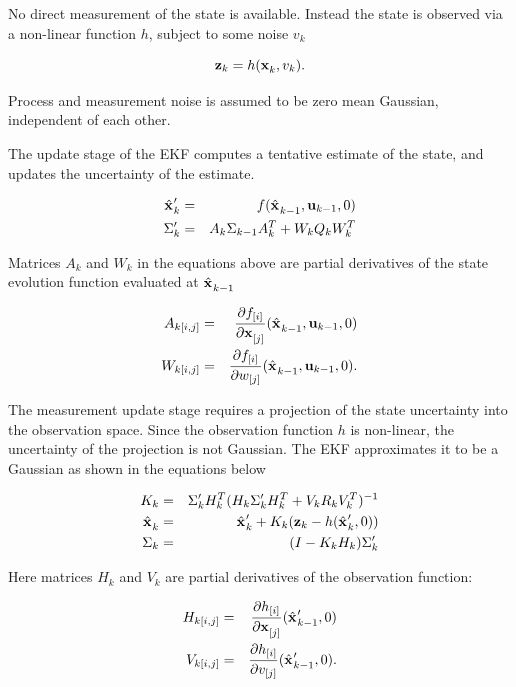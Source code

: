 No direct measurement of the state is available. Instead the state is
observed via a non-linear function $h$, subject to some noise $v_k$

\begin{equation}
   \z{k} = h (\x{k}{}{}, v_k).
\end{equation}

Process and measurement noise is assumed to be zero mean Gaussian,
independent of each other.

The update stage of the EKF computes a tentative estimate of the state,
and updates the uncertainty of the estimate.

\begin{eqnarray}
\label{eqn:ekf_x_u}
\hat{\x{}{}{}}_k^\prime &=& f(\hat{\x{}{}{}}_{k-1},\U{k-1},0)\\
\label{eqn:ekf_sigma_u}
\Sigma_k^\prime &=& A_k \Sigma_{k-1} A_k^T + W_k Q_{k} W_k^T
\end{eqnarray}

Matrices $A_k$ and $W_k$ in the equations above are partial
derivatives of the state evolution function evaluated at
$\hat{\x{}{}{}}_{k-1}$

\begin{eqnarray}
A_{k[i,j]} &=& \frac{\partial f_{[i]}}{\partial \x{[j]}{}{}}
              (\hat{\x{}{}{}}_{k-1}, \U{k-1}, 0) \\
W_{k[i,j]} &=& \frac{\partial f_{[i]}}{\partial w_{[j]}}
              (\hat{\x{}{}{}}_{k-1}, \U{k-1}, 0).
\end{eqnarray}


The measurement update stage requires a projection of the state
uncertainty into the observation space. Since the observation function $h$
is non-linear, the uncertainty of the projection is not Gaussian. The
EKF approximates it to be a Gaussian as shown in the equations below

\begin{eqnarray}
\label{eqn:ekf_gain}
K_k &=& \Sigma_k^\prime H_k^T(H_k\Sigma_k^\prime H_k^T + V_k R_k
V_k^T)^{-1}\\
\label{eqn:ekf_x_obs}
\hat{\x{}{}{}}_k &=& \hat{\x{}{}{}}_k^\prime + 
                      K_k (\z{k} - h(\hat{\x{}{}{}}_k^\prime,0))\\
\label{eqn:ekf_sigma_obs}
\Sigma_k &=& (I - K_k H_k) \Sigma_k^\prime
\end{eqnarray}

Here matrices $H_k$ and $V_k$ are partial derivatives of the
observation function:

\begin{eqnarray}
H_{k[i,j]} &=& \frac{\partial h_{[i]}}{\partial \x{[j]}{}{}}
              (\hat{\x{}{}{}}_{k-1}^\prime, 0)\\
V_{k[i,j]} &=& \frac{\partial h_{[i]}}{\partial v_{[j]}}
              (\hat{\x{}{}{}}_{k-1}^\prime, 0).
\end{eqnarray}



